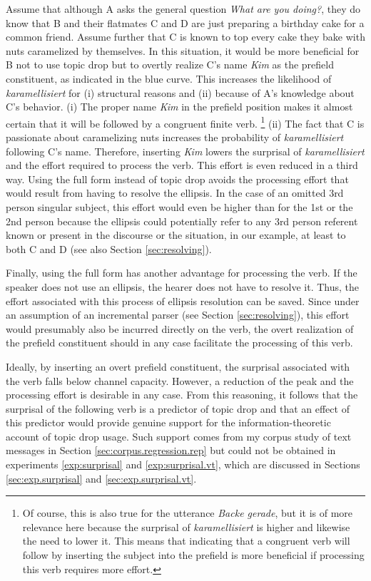 Assume that although A asks the general question \textit{What are you doing?}, they do know that B and their flatmates C and D are just preparing a birthday cake for a common friend.
Assume further that C is known to top every cake they bake with nuts caramelized by themselves.
In this situation, it would be more beneficial for B not to use topic drop but to overtly realize C's name \textit{Kim} as the prefield constituent, as indicated in the blue curve.
This increases the likelihood of \textit{karamellisiert} for (i) structural reasons and (ii) because of A's knowledge about C's behavior.
(i) The proper name \textit{Kim} in the prefield position makes it almost certain that it will be followed by a congruent finite verb.%
\footnote{Of course, this is also true for the utterance \textit{Backe gerade}, but it is of more relevance here because the surprisal of \textit{karamellisiert} is higher and likewise the need to lower it.
This means that indicating that a congruent verb will follow by inserting the subject into the prefield is more beneficial if processing this verb requires more effort. }
%
(ii) The fact that C is passionate about caramelizing nuts increases the probability of \textit{karamellisiert} following C's name.
Therefore, inserting \textit{Kim} lowers the surprisal of \textit{karamellisiert} and the effort required to process the verb.
This effort is even reduced in a third way.
Using the full form instead of topic drop avoids the processing effort that would result from having to resolve the ellipsis.
In the case of an omitted 3rd person singular subject, this effort would even be higher than for the 1st or the 2nd person because the ellipsis could potentially refer to any 3rd person referent known or present in the discourse or the situation, in our example, at least to both C and D (see also Section \ref{sec:resolving}).

Finally, using the full form has another advantage for processing the verb.
If the speaker does not use an ellipsis, the hearer does not have to resolve it.
Thus, the effort associated with this process of ellipsis resolution can be saved.
Since under an assumption of an incremental parser  (see Section \ref{sec:resolving}), this effort would presumably also be incurred directly on the verb, the overt realization of the prefield constituent should in any case facilitate the processing of this verb.

Ideally, by inserting an overt prefield constituent, the surprisal associated with the verb falls below channel capacity.  
However, a reduction of the peak and the processing effort is desirable in any case.
From this reasoning, it follows that the surprisal of the following verb is a predictor of topic drop and that an effect of this predictor would provide genuine support for the information-theoretic account of topic drop usage.
Such support comes from my corpus study of text messages in Section \ref{sec:corpus.regression.rep} but could not be obtained in experiments \ref*{exp:surprisal} and \ref*{exp:surprisal.vt}, which are discussed in Sections \ref{sec:exp.surprisal} and \ref{sec:exp.surprisal.vt}.


